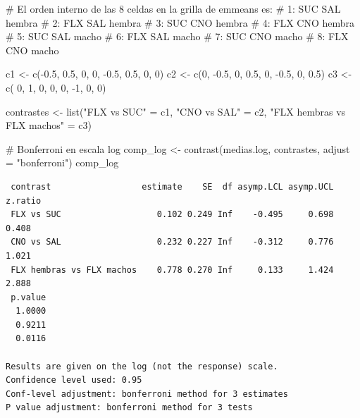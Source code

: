 \documentclass[
  letterpaper,
  DIV=11,
  numbers=noendperiod]{scrartcl}
\newenvironment{Shaded}{\begin{snugshade}}{\end{snugshade}}
\newcommand{\AttributeTok}[1]{\textcolor[rgb]{0.40,0.45,0.13}{#1}}
\newcommand{\CommentTok}[1]{\textcolor[rgb]{0.37,0.37,0.37}{#1}}
\newcommand{\DecValTok}[1]{\textcolor[rgb]{0.68,0.00,0.00}{#1}}
\newcommand{\FloatTok}[1]{\textcolor[rgb]{0.68,0.00,0.00}{#1}}
\newcommand{\FunctionTok}[1]{\textcolor[rgb]{0.28,0.35,0.67}{#1}}
\newcommand{\NormalTok}[1]{\textcolor[rgb]{0.00,0.23,0.31}{#1}}
\newcommand{\OtherTok}[1]{\textcolor[rgb]{0.00,0.23,0.31}{#1}}
\newcommand{\SpecialCharTok}[1]{\textcolor[rgb]{0.37,0.37,0.37}{#1}}
\newcommand{\StringTok}[1]{\textcolor[rgb]{0.13,0.47,0.30}{#1}}
\begin{document}
\begin{Shaded}
\begin{Highlighting}[]
\CommentTok{\# El orden interno de las 8 celdas en la grilla de emmeans es:}
\CommentTok{\# 1: SUC SAL hembra}
\CommentTok{\# 2: FLX SAL hembra}
\CommentTok{\# 3: SUC CNO hembra}
\CommentTok{\# 4: FLX CNO hembra}
\CommentTok{\# 5: SUC SAL macho}
\CommentTok{\# 6: FLX SAL macho}
\CommentTok{\# 7: SUC CNO macho}
\CommentTok{\# 8: FLX CNO macho}

\NormalTok{c1 }\OtherTok{\textless{}{-}} \FunctionTok{c}\NormalTok{(}\SpecialCharTok{{-}}\FloatTok{0.5}\NormalTok{, }\FloatTok{0.5}\NormalTok{, }\DecValTok{0}\NormalTok{, }\DecValTok{0}\NormalTok{, }\SpecialCharTok{{-}}\FloatTok{0.5}\NormalTok{, }\FloatTok{0.5}\NormalTok{, }\DecValTok{0}\NormalTok{, }\DecValTok{0}\NormalTok{)}
\NormalTok{c2 }\OtherTok{\textless{}{-}} \FunctionTok{c}\NormalTok{(}\DecValTok{0}\NormalTok{, }\SpecialCharTok{{-}}\FloatTok{0.5}\NormalTok{, }\DecValTok{0}\NormalTok{, }\FloatTok{0.5}\NormalTok{,  }\DecValTok{0}\NormalTok{, }\SpecialCharTok{{-}}\FloatTok{0.5}\NormalTok{, }\DecValTok{0}\NormalTok{, }\FloatTok{0.5}\NormalTok{)}
\NormalTok{c3 }\OtherTok{\textless{}{-}} \FunctionTok{c}\NormalTok{( }\DecValTok{0}\NormalTok{, }\DecValTok{1}\NormalTok{, }\DecValTok{0}\NormalTok{, }\DecValTok{0}\NormalTok{, }\DecValTok{0}\NormalTok{, }\SpecialCharTok{{-}}\DecValTok{1}\NormalTok{, }\DecValTok{0}\NormalTok{, }\DecValTok{0}\NormalTok{)}

\NormalTok{contrastes }\OtherTok{\textless{}{-}} \FunctionTok{list}\NormalTok{(}\StringTok{"FLX vs SUC"} \OtherTok{=}\NormalTok{ c1, }\StringTok{"CNO vs SAL"} \OtherTok{=}\NormalTok{ c2, }\StringTok{"FLX hembras vs FLX machos"} \OtherTok{=}\NormalTok{ c3)}

\CommentTok{\# Bonferroni en escala log}
\NormalTok{comp\_log }\OtherTok{\textless{}{-}} \FunctionTok{contrast}\NormalTok{(medias.log, contrastes, }\AttributeTok{adjust =} \StringTok{"bonferroni"}\NormalTok{)}
\NormalTok{comp\_log}
\end{Highlighting}
\end{Shaded}

\begin{verbatim}
 contrast                  estimate    SE  df asymp.LCL asymp.UCL z.ratio
 FLX vs SUC                   0.102 0.249 Inf    -0.495     0.698   0.408
 CNO vs SAL                   0.232 0.227 Inf    -0.312     0.776   1.021
 FLX hembras vs FLX machos    0.778 0.270 Inf     0.133     1.424   2.888
 p.value
  1.0000
  0.9211
  0.0116

Results are given on the log (not the response) scale. 
Confidence level used: 0.95 
Conf-level adjustment: bonferroni method for 3 estimates 
P value adjustment: bonferroni method for 3 tests 
\end{verbatim}
\end{document}
